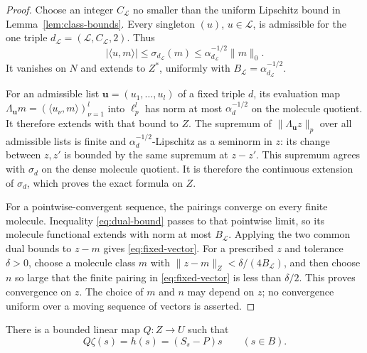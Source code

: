 \begin{proof}
Choose an integer \(C_{\mathcal L}\) no smaller than the uniform
Lipschitz bound in Lemma~\ref{lem:class-bounds}. Every singleton
\((u)\), \(u\in\mathcal L\), is admissible for the one triple
\(d_{\mathcal L}=(\mathcal L,C_{\mathcal L},2)\). Thus
\begin{equation}
 |\langle u,m\rangle|
 \leq\sigma_{d_{\mathcal L}}(m)
 \leq\alpha_{d_{\mathcal L}}^{-1/2}\|m\|_0.                 \label{eq:dual-bound}
\end{equation}
It vanishes on \(N\) and extends to \(Z^*\), uniformly with
\(B_{\mathcal L}=\alpha_{d_{\mathcal L}}^{-1/2}\).

For an admissible list \(\boldsymbol u=(u_1,\ldots,u_l)\) of a
fixed triple \(d\), its evaluation map
\(\Lambda_{\boldsymbol u}m=(\langle u_\nu,m\rangle)_{\nu=1}^l\)
into \(\ell_p^l\) has norm at most \(\alpha_d^{-1/2}\) on the
molecule quotient. It therefore extends with that bound to \(Z\).
The supremum of \(\|\Lambda_{\boldsymbol u}z\|_p\) over all admissible
lists is finite and \(\alpha_d^{-1/2}\)-Lipschitz as a seminorm in
\(z\): its change between \(z,z'\) is bounded by the same supremum
at \(z-z'\). This supremum agrees with \(\sigma_d\) on the dense
molecule quotient. It is therefore the continuous extension of
\(\sigma_d\), which proves the exact formula on \(Z\).

For a pointwise-convergent sequence, the pairings converge on every
finite molecule. Inequality \eqref{eq:dual-bound} passes to that
pointwise limit, so its molecule functional extends with norm at most
\(B_{\mathcal L}\). Applying the two common dual bounds to \(z-m\)
gives \eqref{eq:fixed-vector}. For a prescribed \(z\) and tolerance
\(\delta>0\), choose a molecule class \(m\) with
\(\|z-m\|_Z<\delta/(4B_{\mathcal L})\), and then choose \(n\) so large
that the finite pairing in \eqref{eq:fixed-vector} is less than
\(\delta/2\). This proves convergence on \(z\). The choice of \(m\)
and \(n\) may depend on \(z\); no convergence uniform over a moving
sequence of vectors is asserted.
\end{proof}

\begin{lemma}\label{lem:Q}
There is a bounded linear map \(Q:Z\to U\) such that
\begin{equation}
                         Q\zeta(s)=h(s)=(S_s-P)s
                         \qquad(s\in B).                    \label{eq:Qzeta}
\end{equation}
\end{lemma}

